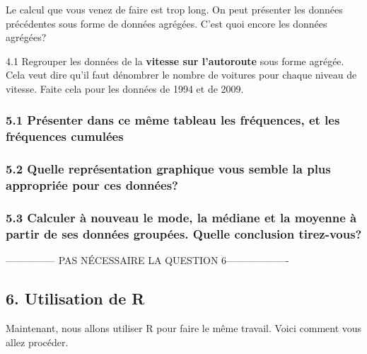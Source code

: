 \documentclass[
]{article}
\begin{document}
Le calcul que vous venez de faire est trop long. On peut présenter les
données précédentes sous forme de données agrégées. C'est quoi encore
les données agrégées?

4.1 Regrouper les données de la \textbf{vitesse sur l'autoroute} sous
forme agrégée. Cela veut dire qu'il faut dénombrer le nombre de voitures
pour chaque niveau de vitesse. Faite cela pour les données de 1994 et de
2009.

\hypertarget{pruxe9senter-dans-ce-muxeame-tableau-les-fruxe9quences-et-les-fruxe9quences-cumuluxe9es}{%
\subsubsection{5.1 Présenter dans ce même tableau les fréquences, et les
fréquences
cumulées}\label{pruxe9senter-dans-ce-muxeame-tableau-les-fruxe9quences-et-les-fruxe9quences-cumuluxe9es}}

\hypertarget{quelle-repruxe9sentation-graphique-vous-semble-la-plus-appropriuxe9e-pour-ces-donnuxe9es}{%
\subsubsection{5.2 Quelle représentation graphique vous semble la plus
appropriée pour ces
données?}\label{quelle-repruxe9sentation-graphique-vous-semble-la-plus-appropriuxe9e-pour-ces-donnuxe9es}}

\hypertarget{calculer-uxe0-nouveau-le-mode-la-muxe9diane-et-la-moyenne-uxe0-partir-de-ses-donnuxe9es-groupuxe9es.-quelle-conclusion-tirez-vous}{%
\subsubsection{5.3 Calculer à nouveau le mode, la médiane et la moyenne
à partir de ses données groupées. Quelle conclusion
tirez-vous?}\label{calculer-uxe0-nouveau-le-mode-la-muxe9diane-et-la-moyenne-uxe0-partir-de-ses-donnuxe9es-groupuxe9es.-quelle-conclusion-tirez-vous}}

--------------- PAS NÉCESSAIRE LA QUESTION 6-------------------

\hypertarget{utilisation-de-r}{%
\subsection{6. Utilisation de R}\label{utilisation-de-r}}

Maintenant, nous allons utiliser R pour faire le même travail. Voici
comment vous allez procéder.
\end{document}
